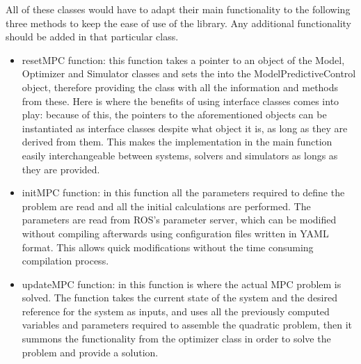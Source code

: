 All of these classes would have to adapt their main functionality to the following three methods to keep the ease of use of the library. Any additional functionality should be added in that particular class.

\begin{itemize}


\item resetMPC function: this function takes a pointer to an object of the Model, Optimizer and Simulator classes and sets the into the ModelPredictiveControl object, therefore providing the class with all the information and methods from these. Here is where the benefits of using interface classes comes into play: because of this, the pointers to the aforementioned objects can be instantiated as interface classes despite what object it is, as long as they are derived from them. This makes the implementation in the main function easily interchangeable between systems, solvers and simulators as longs as they are provided.

\item initMPC function: in this function all the parameters required to define the problem are read and all the initial calculations are performed. The parameters are read from ROS's parameter server, which can be modified without compiling afterwards using configuration files written in YAML format. This allows quick modifications without the time consuming compilation process.

\item updateMPC function: in this function is where the actual MPC problem is solved. The function takes the current state of the system and the desired reference for the system as inputs, and uses all the previously computed variables and parameters required to assemble the quadratic problem, then it summons the functionality from the optimizer class in order to solve the problem and provide a solution.   

\end{itemize}




